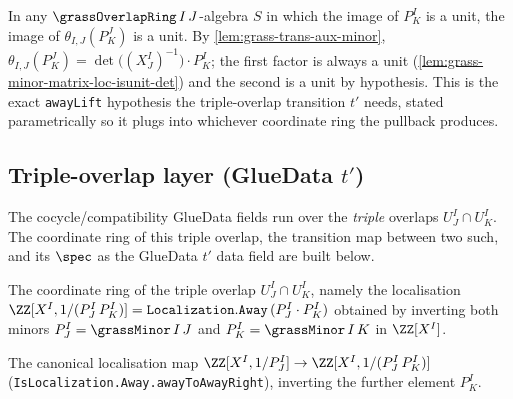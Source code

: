 \begin{lemma}

  \label{lem:grass-trans-aux-minor-isunit-of}
  In any $\grassOverlapRing\,I\,J$-algebra $S$ in which the image of $P^I_K$ is a
  unit, the image of $\theta_{I,J}(P^J_K)$ is a unit. By
  \cref{lem:grass-trans-aux-minor}, $\theta_{I,J}(P^J_K) = \det\big((X^I_J)^{-1}
  \big)\cdot P^I_K$; the first factor is always a unit
  (\cref{lem:grass-minor-matrix-loc-isunit-det}) and the second is a unit by
  hypothesis. This is the exact \texttt{awayLift} hypothesis the triple-overlap
  transition $t'$ needs, stated parametrically so it plugs into whichever
  coordinate ring the pullback produces.
\end{lemma}

\subsection{Triple-overlap layer (GlueData $t'$)}
The cocycle/compatibility GlueData fields run over the \emph{triple} overlaps
$U^I_J\cap U^I_K$. The coordinate ring of this triple overlap, the transition map
between two such, and its $\spec$ as the GlueData $t'$ data field are built below.

\begin{definition}

  \label{def:grass-overlap-ring2}
  The coordinate ring of the triple overlap $U^I_J\cap U^I_K$, namely the
  localisation $\ZZ[X^I,1/(P^I_J\,P^I_K)] = \mathtt{Localization.Away}\,(P^I_J\cdot
  P^I_K)$ obtained by inverting both minors $P^I_J = \grassMinor\,I\,J$ and
  $P^I_K = \grassMinor\,I\,K$ in $\ZZ[X^I]$.
\end{definition}

\begin{definition}

  \label{def:grass-overlap-to-triple}
  The canonical localisation map $\ZZ[X^I,1/P^I_J]\to\ZZ[X^I,1/(P^I_J\,P^I_K)]$
  (\texttt{IsLocalization.Away.awayToAwayRight}), inverting the further element
  $P^I_K$.
\end{definition}

